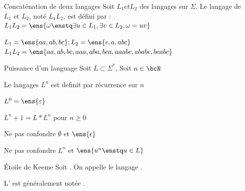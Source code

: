     \begin{definition}{Concaténation de deux langages}{}
        Soit $L_1 et L_2$ des langages sur $\Sigma$.
        Le langage   de $L_1$ et $L_2$, noté $L_1 L_2$, est défini par :
        $L_1 L_2 = \ens{\omega \enstq \exists u \in L_1, \exists v \in L_2, \omega = uv}$
    \end{definition}
    
    \begin{example}{}{}
        $L_1 = \ens{aa, ab, bc} ; L_2 = \ens{\epsilon, a, abc}$
        $L_1 L_2 = \ens{aa, ab, bc, aaa, aba, bca, aaabc, ababc, bcabc}$
    \end{example}
    
    \begin{definition}{Puissance d'un language }
        Soit $L \subset \Sigma^*$, Soit $n\in \bcN$  
        
        
        Le langages $L^n$ est definit par récurrence sur $n$
        \begin{enumerate}{}{}
            
            \itt $L^0 = \ens{ \varepsilon}$
            
            \itt %
                $L^n+1 = L * L^n $ pour $n \geq 0$ 
                
        \end{enumerate}{}
        
    \end{definition}
    
    \begin{warning}{}{}
        \begin{enumerate}
            \itast Ne pas confondre $\emptyset$ et $\ens{\epsilon}$
            
            \itast Ne pas confondre $L^n$ et $\ens{u^n \enstq u \in L}$
        \end{enumerate}
    \end{warning}
    
    \begin{definition}{Étoile de Keeme}{}
        Soit . On appelle  le langage .
    \end{definition}
    
    \begin{notation}
        L' est généralement notée .
    \end{notation}
    
